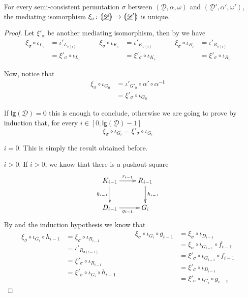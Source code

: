 \documentclass[a4paper,UKenglish,cleveref,pdftex,thm-restate,numberwithinsect]{lipics-v2021}
\newcommand{\dder}[1]{\mathscr{#1}}
\newcommand{\der}[1]{\underline{\dder{#1}}}
\newcommand{\lpro}{\langle \hspace{-1.85pt}[}
\newcommand{\rpro}{]\hspace{-1.85pt}\rangle}
\newcommand{\tpro}[1]{\lpro \der{#1}\rpro}
\newcommand{\lgh}[0]{\mathsf{lg}}
\begin{document}
\begin{proposition}\label{prop:isouno} For every semi-consistent permutation $\sigma$ between  $(\der{D}, \alpha, \omega)$ and $(\der{D}', \alpha', \omega')$, the mediating isomorphism $\xi_\sigma\colon \tpro{D}\to \lpro \der{D}'\rpro$ is unique.
\end{proposition}
\begin{proof} Let $\xi'_\sigma$ be another mediating isomorphism, then by  we have
	\[\begin{split}
		\xi_\sigma \circ \iota_{L_i}&=\iota'_{L_{\sigma(i)}}\\&=\xi'_\sigma\circ \iota_{L_i}
	\end{split} \qquad \begin{split}
		\xi_\sigma \circ \iota_{K_i}&=\iota'_{K_{\sigma(i)}}\\&=\xi'_\sigma\circ \iota_{K_i}
	\end{split} \qquad \begin{split}
		\xi_\sigma \circ \iota_{R_i}&=\iota'_{R_{\sigma(i)}}\\&=\xi'_\sigma\circ \iota_{R_i}
	\end{split}\]
	
	Now, notice that 
	\begin{align*}
		\xi_\sigma \circ \iota_{G_0}&=\iota'_{G'_0}\circ \alpha'\circ \alpha^{-1}\\&=\xi'_\sigma \circ \iota_{G_0}
	\end{align*}
	
	If $\lgh(\der{D})=0$ this is enough to conclude, otherwise we are going to prove by induction that, for every $i\in [0, \lgh(\der{D})-1]$
	\[
	\xi_\sigma \circ \iota_{G_i}=\xi'_\sigma\circ \iota_{G_i}
	\]	
	
	\smallskip \noindent $i=0$. This is simply the result obtained before.
	
	\smallskip \noindent $i >0$. If $i>0$, we know that there is a pushout square
	\[\xymatrix{K_{i-1}\ar[r]^{r_{i-1}} \ar[d]_{k_{i-1}}& R_{i-1} \ar[d]^{h_{i-1}}\\ D_{i-1} \ar[r]_{g_{i-1}}& G_i}\] 
	By  and the induction hypothesis we know that
	\[\begin{split}
		\xi_\sigma \circ \iota_{G_i}\circ h_{i-1}&=  \xi_\sigma\circ \iota_{R_{i-1}}\\&=\iota'_{R_{\sigma(i-1)}}\\&=\xi'_{\sigma}\circ \iota_{R_{i-1}}\\&=\xi'_{\sigma} \circ \iota_{G_i}\circ h_{i-1}\\&
	\end{split} \qquad
	\begin{split}
		\xi_\sigma \circ \iota_{G_i}\circ g_{i-1}&=\xi_{\sigma}\circ \iota_{D_{i-1}}\\&=\xi_{\sigma}\circ \iota_{G_{i-1}} \circ f_{i-1}\\&=\xi'_{\sigma}\circ \iota_{G_{i-1}} \circ f_{i-1}\\&=\xi'_{\sigma}\circ \iota_{D_{i-1}} \\&=\xi'_{\sigma}\circ \iota_{G_{i}} \circ g_{i-1}
	\end{split}
	\]
	

\end{proof}
\end{document}
